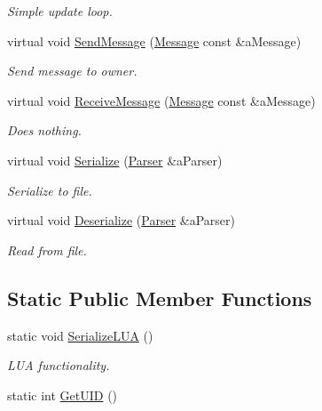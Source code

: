\begin{DoxyCompactItemize}
\begin{DoxyCompactList}\small\item\em Simple update loop. \end{DoxyCompactList}\item 
virtual void \hyperlink{classPCShaderSurface_a080c3656b20f23493096d16325bc3005}{Send\+Message} (\hyperlink{classMessage}{Message} const \&a\+Message)
\begin{DoxyCompactList}\small\item\em Send message to owner. \end{DoxyCompactList}\item 
virtual void \hyperlink{classPCShaderSurface_ae004f90212579a2448de1b7bc014bc1e}{Receive\+Message} (\hyperlink{classMessage}{Message} const \&a\+Message)
\begin{DoxyCompactList}\small\item\em Does nothing. \end{DoxyCompactList}\item 
virtual void \hyperlink{classPCShaderSurface_a540f9f1d910279d4f60a707a059fb0e1}{Serialize} (\hyperlink{classParser}{Parser} \&a\+Parser)
\begin{DoxyCompactList}\small\item\em Serialize to file. \end{DoxyCompactList}\item 
virtual void \hyperlink{classPCShaderSurface_ae655e35c7c679f8d4de963786cc24fa5}{Deserialize} (\hyperlink{classParser}{Parser} \&a\+Parser)
\begin{DoxyCompactList}\small\item\em Read from file. \end{DoxyCompactList}\end{DoxyCompactItemize}
\subsection*{Static Public Member Functions}
\begin{DoxyCompactItemize}
\item 
static void \hyperlink{classPCShaderSurface_a6b1c77a2ef538e1a851440bb0c3d1170}{Serialize\+L\+UA} ()
\begin{DoxyCompactList}\small\item\em L\+UA functionality. \end{DoxyCompactList}\item 
static int \hyperlink{classPCShaderSurface_a50da8a4c0936d8c69046bdc6041eb180}{Get\+U\+ID} ()
\end{DoxyCompactItemize}
